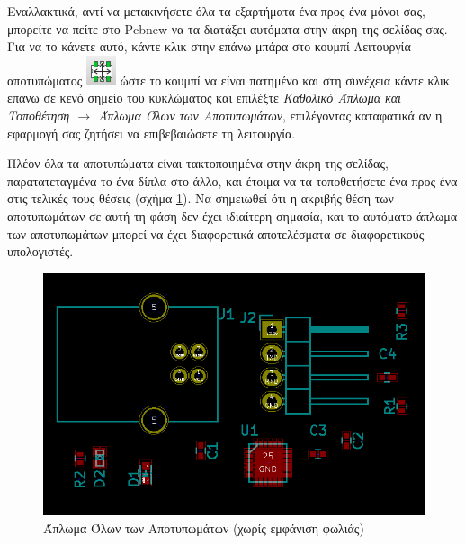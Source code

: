 \documentclass[a4paper]{article}
\begin{document}
Εναλλακτικά, αντί να μετακινήσετε όλα τα εξαρτήματα ένα προς ένα μόνοι σας, μπορείτε να πείτε στο Pcbnew να τα διατάξει αυτόματα στην άκρη της σελίδας σας. Για να το κάνετε αυτό, κάντε κλικ στην επάνω μπάρα στο κουμπί Λειτουργία αποτυπώματος \includegraphics[scale=.5]{img/pcb-ico-footmod.png} ώστε το κουμπί να είναι πατημένο και στη συνέχεια κάντε κλικ επάνω σε κενό σημείο του κυκλώματος και επιλέξτε \textit{Καθολικό Άπλωμα και Τοποθέτηση $\rightarrow$ Άπλωμα Όλων των Αποτυπωμάτων}, επιλέγοντας καταφατικά αν η εφαρμογή σας ζητήσει να επιβεβαιώσετε τη λειτουργία. 

Πλέον όλα τα αποτυπώματα είναι τακτοποιημένα στην άκρη της σελίδας, παρατατεταγμένα το ένα δίπλα στο άλλο, και έτοιμα να τα τοποθετήσετε ένα προς ένα στις τελικές τους θέσεις (σχήμα \ref{fig:pcb-circ-allspread}). Να σημειωθεί ότι η ακριβής θέση των αποτυπωμάτων σε αυτή τη φάση δεν έχει ιδιαίτερη σημασία, και το αυτόματο άπλωμα των αποτυπωμάτων μπορεί να έχει διαφορετικά αποτελέσματα σε διαφορετικούς υπολογιστές.

\begin{figure}
  \begin{center}
    \includegraphics[width=.9\textwidth]{img/pcb-circ-allspread.png}
    \caption{Άπλωμα Όλων των Αποτυπωμάτων (χωρίς εμφάνιση φωλιάς)}
    \label{fig:pcb-circ-allspread}
  \end{center}
\end{figure}
\end{document}
